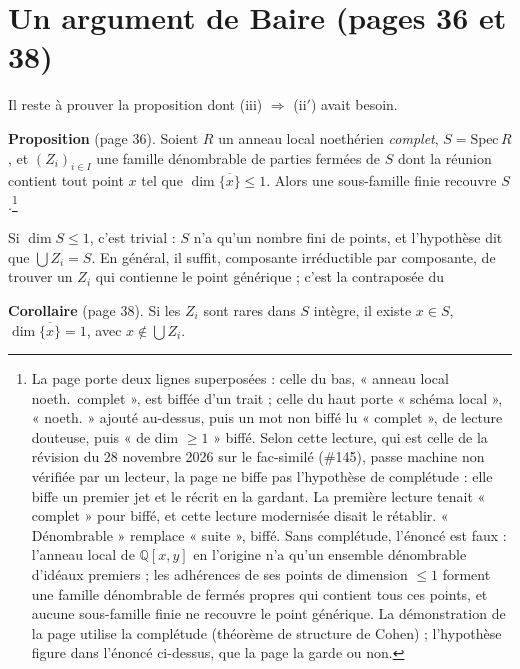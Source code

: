 \documentclass[11pt,a4paper]{article}
\begin{document}
\section*{Un argument de Baire (pages 36 et 38)}

Il reste à prouver la proposition dont (iii) $\Rightarrow$ (ii$'$) avait
besoin.

\textbf{Proposition} (page 36). Soient $R$ un anneau local noethérien
\emph{complet}, $S = \mathrm{Spec}\,R$, et $(Z_i)_{i \in I}$ une famille
dénombrable de parties fermées de $S$ dont la réunion contient tout point $x$
tel que $\dim \overline{\{x\}} \leq 1$. Alors une sous-famille finie recouvre
$S$.\footnote{La page porte deux lignes superposées : celle du bas, « anneau
local noeth.\ complet », est biffée d'un trait ; celle du haut porte
« schéma local », « noeth. » ajouté au-dessus, puis un mot non biffé lu
« complet », de lecture douteuse, puis « de dim $\geq 1$ » biffé. Selon
cette lecture, qui est celle de la révision du 28 novembre 2026 sur le fac-similé (\#145), passe machine non vérifiée par un lecteur, la page ne biffe pas l'hypothèse de complétude : elle biffe un
premier jet et le récrit en la gardant. La première lecture tenait
« complet » pour biffé, et cette lecture modernisée disait le rétablir.
« Dénombrable » remplace « suite », biffé. Sans complétude, l'énoncé est faux : l'anneau
local de $\mathbb{Q}[x,y]$ en l'origine n'a qu'un ensemble dénombrable
d'idéaux premiers ; les adhérences de ses points de dimension $\leq 1$
forment une famille dénombrable de fermés propres qui contient tous ces
points, et aucune sous-famille finie ne recouvre le point générique. La
démonstration de la page utilise la complétude (théorème de structure de
Cohen) ; l'hypothèse figure dans l'énoncé ci-dessus, que la page la garde ou
non.}

Si $\dim S \leq 1$, c'est trivial : $S$ n'a qu'un nombre fini de points, et
l'hypothèse dit que $\bigcup Z_i = S$. En général, il suffit, composante irréductible par
composante, de trouver un $Z_i$ qui contienne le point générique ; c'est la
contraposée du

\textbf{Corollaire} (page 38). Si les $Z_i$ sont rares dans $S$ intègre, il
existe $x \in S$, $\dim \overline{\{x\}} = 1$, avec
$x \notin \bigcup Z_i$.
\end{document}
